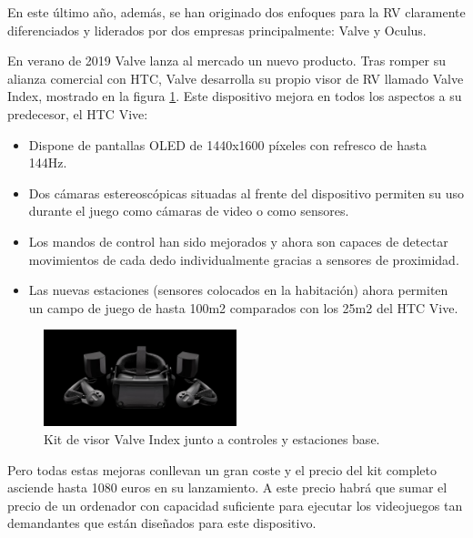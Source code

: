 En este último año, además, se han originado dos enfoques para la RV claramente diferenciados y liderados por dos empresas principalmente: Valve y Oculus.

En verano de 2019 Valve lanza al mercado un nuevo producto. Tras romper su alianza comercial con HTC, Valve desarrolla su propio visor de RV llamado Valve Index, mostrado en la figura \ref{fig:EA_index}. Este dispositivo mejora en todos los aspectos a su predecesor, el HTC Vive:


\begin{itemize}
	\item{Dispone de pantallas OLED de 1440x1600 píxeles con refresco de hasta 144Hz.}

	\item{Dos cámaras estereoscópicas situadas al frente del dispositivo permiten su uso durante el juego como cámaras de video o como sensores.}

	\item{Los mandos de control han sido mejorados y ahora son capaces de detectar movimientos de cada dedo individualmente gracias a sensores de proximidad.}
	
	\item{Las nuevas estaciones (sensores colocados en la habitación) ahora permiten un campo de juego de hasta 100m2 comparados con los 25m2 del HTC Vive.}

\end{itemize}


\begin{figure}
  \centering
\includegraphics[width=0.5\textwidth]{03.EstudioProblema/01.EstadoArte/00.Figuras/24.valve_index.jpg}
    \caption{Kit de visor Valve Index junto a controles y estaciones base. \cite{EA_img_index}}
    \label{fig:EA_index}
\end{figure}



Pero todas estas mejoras conllevan un gran coste y el precio del kit completo asciende hasta 1080 euros en su lanzamiento. A este precio habrá que sumar el precio de un ordenador con capacidad suficiente para ejecutar los videojuegos tan demandantes que están diseñados para este dispositivo.

